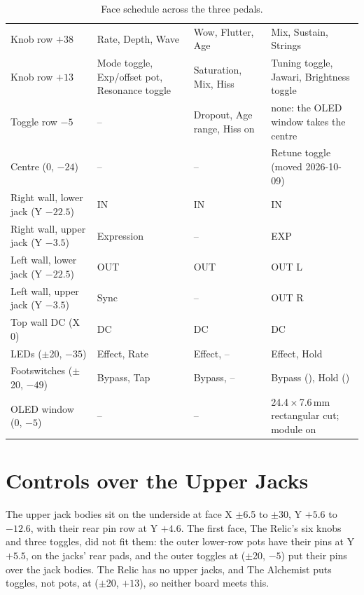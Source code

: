 \begin{table}[H]
  \small\renewcommand{\arraystretch}{1.12}
  \caption{Face schedule across the three pedals.}\label{tab:face}
  \begin{tabularx}{\textwidth}{@{}>{\raggedright\arraybackslash}p{36mm} >{\raggedright\arraybackslash}p{26mm} >{\raggedright\arraybackslash}p{26mm} L@{}}
    \toprule
     &  &  &  \\
    \midrule
    Knob row $+38$ & Rate, Depth, Wave & Wow, Flutter, Age &  Mix,  Sustain,  Strings \\
    Knob row $+13$ & Mode toggle, Exp/offset pot, Resonance toggle & Saturation, Mix, Hiss &  Tuning toggle,  Jawari,  Brightness toggle \\
    Toggle row $-5$ & -- & Dropout, Age range, Hiss on & none: the OLED window takes the centre \\
    Centre (0, $-24$) & -- & -- &  Retune toggle (moved 2026-10-09) \\
    Right wall, lower jack (Y $-22.5$) & IN & IN &  IN \\
    Right wall, upper jack (Y $-3.5$) & Expression & -- &  EXP \\
    Left wall, lower jack (Y $-22.5$) & OUT & OUT &  OUT L \\
    Left wall, upper jack (Y $-3.5$) & Sync & -- &  OUT R \\
    Top wall DC (X 0) & DC & DC &  DC \\
    LEDs ($\pm$20, $-35$) & Effect, Rate & Effect, -- &  Effect,  Hold \\
    Footswitches ($\pm$20, $-49$) & Bypass, Tap & Bypass, -- & Bypass (), Hold () \\
    OLED window (0, $-5$) & -- & -- & 24.4\,$\times$\,7.6\,mm rectangular cut; module on  \\
    \bottomrule
  \end{tabularx}
\end{table}

\section{Controls over the Upper Jacks}\label{sec:toggleconflict}
The upper jack bodies sit on the underside at face X $\pm$6.5 to $\pm$30, Y $+5.6$ to $-12.6$, with their rear pin row at Y $+4.6$. The first face, The Relic's six knobs and three toggles, did not fit them: the outer lower-row pots have their pins at Y $+5.5$, on the jacks' rear pads, and the outer toggles at ($\pm$20, $-5$) put their pins over the jack bodies. The Relic has no upper jacks, and The Alchemist puts toggles, not pots, at ($\pm$20, $+13$), so neither board meets this.

